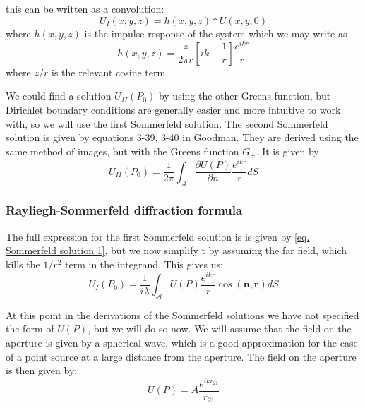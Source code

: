 \documentclass[../../main.tex]{subfiles}
\begin{document}
\begin{aside}
    this can be written as a convolution:
    \begin{equation}\label{eq. Sommerfeld solution 1 convolution}
       U_I(x,y,z)=h(x,y,z)*U(x,y,0)
    \end{equation}
    where $h(x,y,z)$ is the impulse response of the system which we may write as 
    \begin{equation}\label{eq. impulse response}
        h(x,y,z)=\frac{z}{2\pi r}\left[ik-\frac{1}{r}\right]\frac{e^{ikr}}{r}
    \end{equation}
    where $z/r$ is the relevant cosine term.
\end{aside}

We could find a solution $U_{II}(P_0)$ by using the other Greens function, but Dirichlet boundary conditions are generally easier and more intuitive to work with, so we will use the first Sommerfeld solution. The second Sommerfeld solution is given by equations 3-39, 3-40 in Goodman. They are derived using the same method of images, but with the Greens function $G_+$. It is given by
\begin{equation}\label{eq. Sommerfeld solution 2}
    U_{II}(P_0)=\frac{1}{2\pi}\int_{\mathcal{A}}\frac{\partial U(P)}{\partial n}\frac{e^{ikr}}{r}dS
\end{equation}

\subsubsection{Rayliegh-Sommerfeld diffraction formula}
The full expression for the first Sommerfeld solution is is given by \cref{eq. Sommerfeld solution 1}, but we now simplify t by assuming the far field, which kills the $1/r^2$ term in the integrand. This gives us:
\begin{equation}\label{eq. Sommerfeld solution 1 far field}
    U_I(P_0)=\frac{1}{i\lambda}\int_{\mathcal{A}}U(P)\frac{e^{ikr}}{r}\cos(\mathbf{n},\mathbf{r})dS
\end{equation}

At this point in the derivations of the Sommerfeld solutions we have not specified the form of $U(P)$, but we will do so now. We will assume that the field on the aperture is given by a spherical wave, which is a good approximation for the case of a point source at a large distance from the aperture. The field on the aperture is then given by:
\begin{equation}\label{eq. spherical wave U}
    U(P)=A\frac{e^{ikr_{21}}}{r_{21}}
\end{equation}
\end{document}
